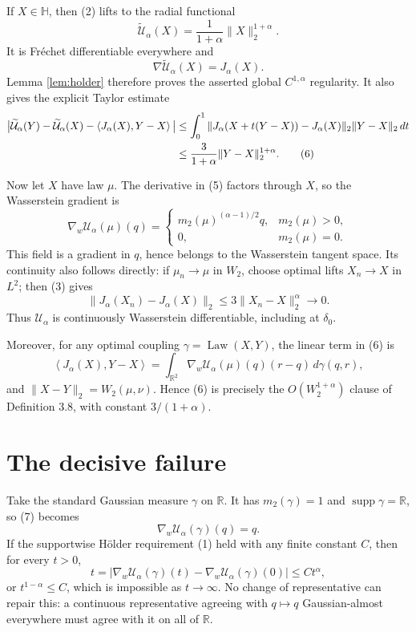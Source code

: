 \documentclass[11pt]{article}
\newcommand{\R}{\mathbb R}
\newcommand{\Hh}{\mathbb H}
\newcommand{\Ua}{\mathcal U_\alpha}
\newcommand{\Uat}{\widetilde{\mathcal U}_\alpha}
\newcommand{\supp}{\operatorname{supp}}
\newcommand{\Law}{\operatorname{Law}}
\newcommand{\ip}[2]{\left\langle #1,#2\right\rangle}
\begin{document}
If \(X\in\Hh\), then (2) lifts to the radial functional
\begin{equation}
 \Uat(X)=\frac{1}{1+\alpha}\|X\|_2^{1+\alpha}.
 \tag{4}
\end{equation}
It is Fr\'echet differentiable everywhere and
\[
 \nabla\Uat(X)=J_\alpha(X).
 \tag{5}
\]
Lemma \ref{lem:holder} therefore proves the asserted global
\(C^{1,\alpha}\) regularity. It also gives the explicit Taylor estimate
\begin{align}
 \big|\Uat(Y)-\Uat(X)-\ip{J_\alpha(X)}{Y-X}\big|
 &\le \int_0^1
 \|J_\alpha(X+t(Y-X))-J_\alpha(X)\|_2\|Y-X\|_2\,dt \notag\\
 &\le \frac{3}{1+\alpha}\|Y-X\|_2^{1+\alpha}.
 \tag{6}
\end{align}

Now let \(X\) have law \(\mu\). The derivative in (5) factors through
\(X\), so the Wasserstein gradient is
\begin{equation}
 \nabla_w\Ua(\mu)(q)=
 \begin{cases}
 m_2(\mu)^{(\alpha-1)/2}q,&m_2(\mu)>0,\\
 0,&m_2(\mu)=0.
 \end{cases}
 \tag{7}
\end{equation}
This field is a gradient in \(q\), hence belongs to the Wasserstein
tangent space. Its continuity also follows directly: if
\(\mu_n\to\mu\) in \(W_2\), choose optimal lifts
\(X_n\to X\) in \(L^2\); then (3) gives
\[
 \|J_\alpha(X_n)-J_\alpha(X)\|_2
 \le3\|X_n-X\|_2^\alpha\longrightarrow0.
\]
Thus \(\Ua\) is continuously Wasserstein differentiable, including at
\(\delta_0\).

Moreover, for any optimal coupling \(\gamma=\Law(X,Y)\), the linear
term in (6) is
\[
 \ip{J_\alpha(X)}{Y-X}
 =\int_{\R^2}\nabla_w\Ua(\mu)(q)(r-q)\,d\gamma(q,r),
\]
and \(\|X-Y\|_2=W_2(\mu,\nu)\). Hence (6) is precisely the
\(O(W_2^{1+\alpha})\) clause of Definition 3.8, with constant
\(3/(1+\alpha)\).

\section{The decisive failure}

Take the standard Gaussian measure \(\gamma\) on \(\R\). It has
\(m_2(\gamma)=1\) and \(\supp\gamma=\R\), so (7) becomes
\[
 \nabla_w\Ua(\gamma)(q)=q.
\]
If the supportwise H\"older requirement (1) held with any finite
constant \(C\), then for every \(t>0\),
\[
 t=|\nabla_w\Ua(\gamma)(t)-\nabla_w\Ua(\gamma)(0)|
 \le Ct^\alpha,
\]
or \(t^{1-\alpha}\le C\), which is impossible as \(t\to\infty\).
No change of representative can repair this: a continuous
representative agreeing with \(q\mapsto q\) Gaussian-almost everywhere
must agree with it on all of \(\R\).
\end{document}
